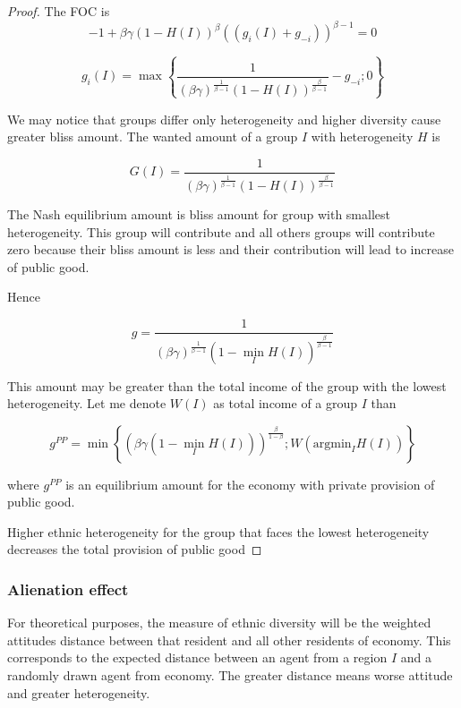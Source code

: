 \documentclass[letterpaper,11pt]{article}
\begin{document}
\begin{proof}
The FOC is
\[ -1 + \beta\gamma (1 - H(I))^{\beta} ((g_i(I) + g_{-i} ))^{\beta-1} = 0 \]

\[ g_i(I) = \max \left\{\frac{1}{(\beta\gamma )^\frac{1}{\beta - 1} (1 - H(I))^\frac{\beta}{\beta-1} } - g_{-i} ; 0  \right\}   \]

We may notice that groups differ only heterogeneity and higher diversity cause greater bliss amount. The wanted amount of a group $I$ with heterogeneity $H$ is 

\[ G(I) =  \frac{1}{(\beta\gamma )^\frac{1}{\beta - 1} (1 - H(I))^\frac{\beta}{\beta-1} } \]

The Nash equilibrium amount is bliss amount for group with smallest heterogeneity. This group will contribute and all others groups will contribute zero because their bliss amount is less and their contribution will lead to increase of public good.

Hence 

\[g = \frac{1}{(\beta\gamma )^\frac{1}{\beta - 1} (1 - \min_{I} H(I))^\frac{\beta}{\beta-1} } \]

This amount may be greater than the total income of the group with the lowest heterogeneity. Let me denote $W(I)$ as total income of a group $I$ than 

\begin{equation}
    g^{PP} = \min \left\{ (\beta\gamma  ( 1 - \min_{I} H(I)))^\frac{\beta}{1 -\beta}; W( \text{argmin}_{I} H(I)) \right\}
    \label{eq:privat}
\end{equation}

where $g^{PP}$ is an equilibrium amount for the economy with private provision of public good.

Higher ethnic heterogeneity for the group that faces the lowest heterogeneity decreases the total provision of public good 
\end{proof}

\subsubsection{Alienation effect}

For theoretical purposes, the measure of ethnic diversity will be the weighted attitudes distance between that resident and all other residents of economy. This corresponds to the expected distance between an agent from a region $I$ and a randomly drawn agent from economy. The greater distance means worse attitude and greater heterogeneity.
\end{document}
